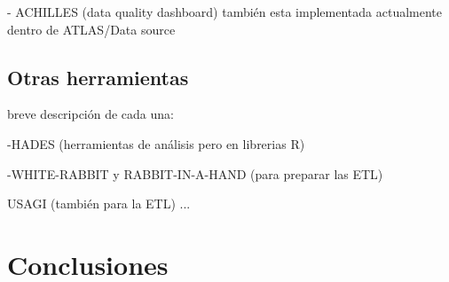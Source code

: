 - ACHILLES (data quality dashboard) también esta implementada actualmente dentro de ATLAS/Data source


\subsection{Otras herramientas}

breve descripción de cada una:

-HADES (herramientas de análisis pero en librerias R)

-WHITE-RABBIT y RABBIT-IN-A-HAND (para preparar las ETL)

USAGI (también para la ETL)
...

\section{Conclusiones}